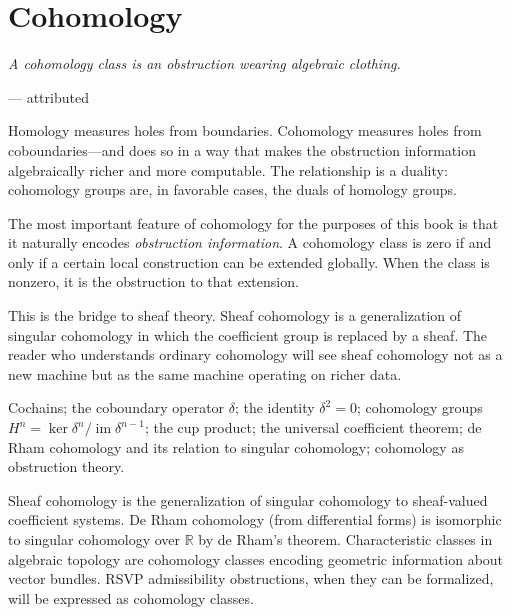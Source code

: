 \documentclass[12pt, twoside, openright, a4paper]{book}
\newcommand{\sidenote}[1]{\marginnote{#1}}
\newcommand{\R}{\mathbb{R}}
\DeclareMathOperator{\im}{im}
\newcommand{\chapterepigraph}[2]{%
  \vspace{-8pt}\begin{center}\begin{minipage}{0.78\textwidth}
  \small\itshape #1\begin{flushright}--- #2\end{flushright}
  \end{minipage}\end{center}\vspace{10pt}}
\begin{document}
\chapter{Cohomology}
\chapterepigraph{A cohomology class is an obstruction wearing algebraic clothing.}{attributed}
\sidenote{Recommended:\\Hatcher, Ch.\,3;\\Bott--Tu}
\label{ch:cohomology}

\begin{motivation}
Homology measures holes from boundaries.
Cohomology measures holes from coboundaries---and does so in a way that makes the obstruction information algebraically richer and more computable.
The relationship is a duality: cohomology groups are, in favorable cases, the duals of homology groups.

The most important feature of cohomology for the purposes of this book is that it naturally encodes \emph{obstruction information}.
A cohomology class is zero if and only if a certain local construction can be extended globally.
When the class is nonzero, it is the obstruction to that extension.

This is the bridge to sheaf theory.
Sheaf cohomology is a generalization of singular cohomology in which the coefficient group is replaced by a sheaf.
The reader who understands ordinary cohomology will see sheaf cohomology not as a new machine but as the same machine operating on richer data.
\end{motivation}

\begin{structures}
Cochains; the coboundary operator $\delta$; the identity $\delta^2 = 0$; cohomology groups $H^n = \ker\delta^n / \im\delta^{n-1}$; the cup product; the universal coefficient theorem; de Rham cohomology and its relation to singular cohomology; cohomology as obstruction theory.
\end{structures}

\begin{dependencies}
Sheaf cohomology is the generalization of singular cohomology to sheaf-valued coefficient systems.
De Rham cohomology (from differential forms) is isomorphic to singular cohomology over $\R$ by de Rham's theorem.
Characteristic classes in algebraic topology are cohomology classes encoding geometric information about vector bundles.
RSVP admissibility obstructions, when they can be formalized, will be expressed as cohomology classes.
\end{dependencies}
\end{document}
